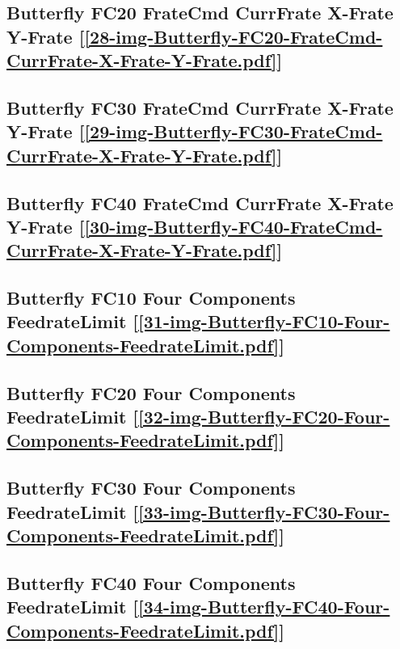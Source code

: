 \subsection       {Butterfly FC20 FrateCmd CurrFrate X-Frate Y-Frate
	[\ref      {28-img-Butterfly-FC20-FrateCmd-CurrFrate-X-Frate-Y-Frate.pdf}] }
\label{ssec-28-img-Butterfly-FC20-FrateCmd-CurrFrate-X-Frate-Y-Frate.pdf}

\subsection       {Butterfly FC30 FrateCmd CurrFrate X-Frate Y-Frate
	[\ref      {29-img-Butterfly-FC30-FrateCmd-CurrFrate-X-Frate-Y-Frate.pdf}] }
\label{ssec-29-img-Butterfly-FC30-FrateCmd-CurrFrate-X-Frate-Y-Frate.pdf}

\subsection       {Butterfly FC40 FrateCmd CurrFrate X-Frate Y-Frate
	[\ref      {30-img-Butterfly-FC40-FrateCmd-CurrFrate-X-Frate-Y-Frate.pdf}] }
\label{ssec-30-img-Butterfly-FC40-FrateCmd-CurrFrate-X-Frate-Y-Frate.pdf}

\subsection       {Butterfly FC10 Four Components FeedrateLimit
	[\ref      {31-img-Butterfly-FC10-Four-Components-FeedrateLimit.pdf}] }
\label{ssec-31-img-Butterfly-FC10-Four-Components-FeedrateLimit.pdf}

\subsection       {Butterfly FC20 Four Components FeedrateLimit
	[\ref      {32-img-Butterfly-FC20-Four-Components-FeedrateLimit.pdf}] }
\label{ssec-32-img-Butterfly-FC20-Four-Components-FeedrateLimit.pdf}

\subsection       {Butterfly FC30 Four Components FeedrateLimit
	[\ref      {33-img-Butterfly-FC30-Four-Components-FeedrateLimit.pdf}] }
\label{ssec-33-img-Butterfly-FC30-Four-Components-FeedrateLimit.pdf}

\subsection       {Butterfly FC40 Four Components FeedrateLimit
	[\ref      {34-img-Butterfly-FC40-Four-Components-FeedrateLimit.pdf}]}
\label{ssec-34-img-Butterfly-FC40-Four-Components-FeedrateLimit.pdf}

